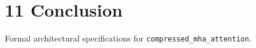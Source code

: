 \section{11 Conclusion}

Formal architectural specifications for \texttt{compressed_mha_attention}.
